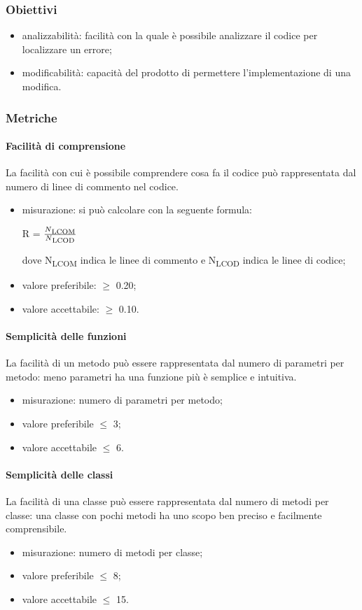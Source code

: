 		\subsubsection{Obiettivi}
		\begin{itemize}
			\item analizzabilità: facilità con la quale è possibile analizzare il codice per localizzare un errore;
			\item modificabilità: capacità del prodotto di permettere l'implementazione di una modifica.
		\end{itemize}
		\subsubsection{Metriche}
			\paragraph{Facilità di comprensione}
			La facilità con cui è possibile comprendere cosa fa il codice può rappresentata dal numero di linee di commento nel codice.
			\begin{itemize}
			\item misurazione: si può calcolare con la seguente formula: \\
			\centerline{R = \(\frac{N\textsubscript{LCOM}}{N\textsubscript{LCOD}} \) }
			dove N\textsubscript{LCOM} indica le linee di commento e N\textsubscript{LCOD} indica le linee di codice;
			\item valore preferibile: $\geq$ 0.20;
			\item valore accettabile: $\geq$ 0.10.
			\end{itemize}
			\paragraph{Semplicità delle funzioni}
			La facilità di un metodo può essere rappresentata dal numero di parametri per metodo: meno parametri ha una funzione più è semplice e intuitiva.
			\begin{itemize}
			\item misurazione: numero di parametri per metodo;
			\item valore preferibile $\leq$ 3;
			\item valore accettabile $\leq$ 6.
			\end{itemize}
			\paragraph{Semplicità delle classi}
			La facilità di una classe può essere rappresentata dal numero di metodi per classe: una classe con pochi metodi ha uno scopo ben preciso e facilmente comprensibile.
			\begin{itemize}
			\item misurazione: numero di metodi per classe;
			\item valore preferibile $\leq$ 8;
			\item valore accettabile $\leq$ 15.
			\end{itemize}
